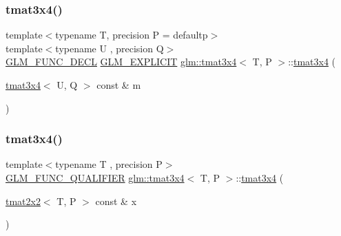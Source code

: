 \mbox{\label{structglm_1_1tmat3x4_a605d52801a88671ed149ac1580f913aa}} 
\subsubsection{\texorpdfstring{tmat3x4()}{tmat3x4()}\hspace{0.1cm}{\footnotesize\ttfamily [10/22]}}
{\footnotesize\ttfamily template$<$typename T, precision P = defaultp$>$ \\
template$<$typename U , precision Q$>$ \\
\mbox{\hyperlink{setup_8hpp_ab2d052de21a70539923e9bcbf6e83a51}{G\+L\+M\+\_\+\+F\+U\+N\+C\+\_\+\+D\+E\+CL}} \mbox{\hyperlink{setup_8hpp_a6c74f5a5e7b134ab69023ff9a30d4d5d}{G\+L\+M\+\_\+\+E\+X\+P\+L\+I\+C\+IT}} \mbox{\hyperlink{structglm_1_1tmat3x4}{glm\+::tmat3x4}}$<$ T, P $>$\+::\mbox{\hyperlink{structglm_1_1tmat3x4}{tmat3x4}} (\begin{DoxyParamCaption}\item[{\mbox{\hyperlink{structglm_1_1tmat3x4}{tmat3x4}}$<$ U, Q $>$ const \&}]{m }\end{DoxyParamCaption})}

\mbox{\label{structglm_1_1tmat3x4_a0ed0439eeabeb33a938b5c1fa0d863b9}} 
\subsubsection{\texorpdfstring{tmat3x4()}{tmat3x4()}\hspace{0.1cm}{\footnotesize\ttfamily [11/22]}}
{\footnotesize\ttfamily template$<$typename T , precision P$>$ \\
\mbox{\hyperlink{setup_8hpp_a33fdea6f91c5f834105f7415e2a64407}{G\+L\+M\+\_\+\+F\+U\+N\+C\+\_\+\+Q\+U\+A\+L\+I\+F\+I\+ER}} \mbox{\hyperlink{structglm_1_1tmat3x4}{glm\+::tmat3x4}}$<$ T, P $>$\+::\mbox{\hyperlink{structglm_1_1tmat3x4}{tmat3x4}} (\begin{DoxyParamCaption}\item[{\mbox{\hyperlink{structglm_1_1tmat2x2}{tmat2x2}}$<$ T, P $>$ const \&}]{x }\end{DoxyParamCaption})}



